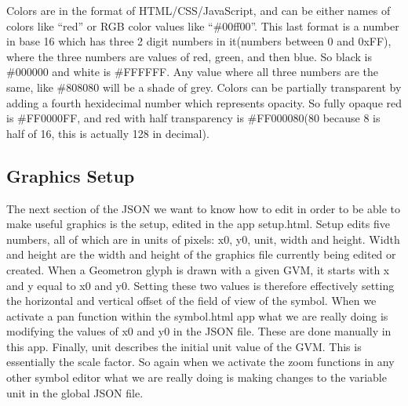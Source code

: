 Colors are in the format of HTML/CSS/JavaScript, and can be either names of colors like ``red'' or RGB color values like ``\#00ff00''.  This last format is a number in base 16 which has three 2 digit numbers in it(numbers between 0 and 0xFF), where the three numbers are values of red, green, and then blue.  So black is \#000000 and white is \#FFFFFF.  Any value where all three numbers are the same, like \#808080 will be a shade of grey.   Colors can be partially transparent by adding a fourth hexidecimal number which represents opacity.  So fully opaque red is \#FF0000FF, and red with half transparency is #FF000080(80 because 8 is half of 16, this is actually 128 in decimal).

\subsection{Graphics Setup}

The next section of the JSON we want to know how to edit in order to be able to make useful graphics is the setup, edited in the app setup.html.  Setup edits five numbers, all of which are in units of pixels: x0, y0, unit, width and height.  Width and height are the width and height of the graphics file currently being edited or created.  When a Geometron glyph is drawn with a given GVM, it starts with x and y equal to x0 and y0. Setting these two values is therefore effectively setting the horizontal and vertical offset of the field of view of the symbol.  When we activate a pan function within the symbol.html app what we are really doing is modifying the values of x0 and y0 in the JSON file.  These are done manually in this app.  Finally, unit describes the initial unit value of the GVM.  This is essentially the scale factor.  So again when we activate the zoom functions in any other symbol editor what we are really doing is making changes to the variable unit in the global JSON file.    


